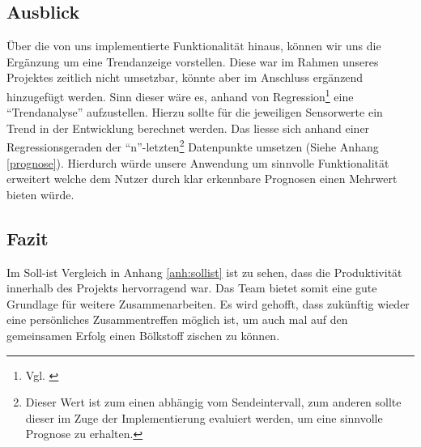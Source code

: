 \subsection{Ausblick}\label{subsec:ausblick}
Über die von uns implementierte Funktionalität hinaus, können wir uns die Ergänzung um eine Trendanzeige vorstellen.
Diese war im Rahmen unseres Projektes zeitlich nicht umsetzbar, könnte aber im Anschluss ergänzend hinzugefügt werden.
Sinn dieser wäre es, anhand von Regression\footnote{Vgl. \cite{regression}} eine \enquote{Trendanalyse} aufzustellen.
Hierzu sollte für die jeweiligen Sensorwerte ein Trend in der Entwicklung berechnet werden.
Das liesse sich anhand einer Regressionsgeraden der \enquote{n}-letzten\footnote{Dieser Wert ist zum einen abhängig vom Sendeintervall, zum anderen sollte dieser im Zuge der Implementierung evaluiert werden, um eine sinnvolle Prognose zu erhalten.} Datenpunkte umsetzen (Siehe Anhang \ref{prognose}).
Hierdurch würde unsere Anwendung um sinnvolle Funktionalität erweitert welche dem Nutzer durch klar erkennbare Prognosen einen Mehrwert bieten würde.

\subsection{Fazit}\label{subsec:fazit}
Im Soll-ist Vergleich in Anhang \ref{anh:sollist} ist zu sehen, dass die Produktivität innerhalb des Projekts hervorragend war. Das Team bietet somit eine
gute Grundlage für weitere Zusammenarbeiten. Es wird gehofft, dass zukünftig wieder eine persönliches Zusammentreffen möglich ist,
um auch mal auf den gemeinsamen Erfolg einen Bölkstoff zischen zu können.


